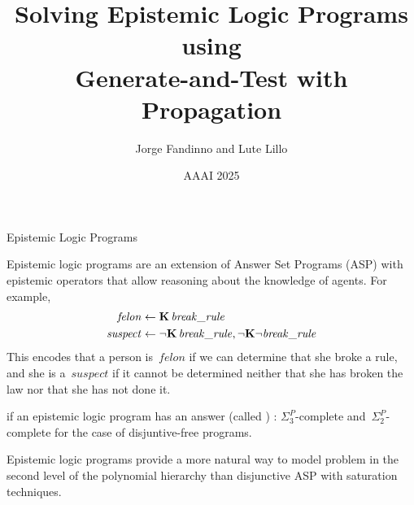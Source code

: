 \documentclass[aspectratio=169,svgnames,xcolor=table,t]{beamer}
\author[J. Fandinno \& Eleuterio Lillo Portero]{{\usebeamercolor[fg]{alerted text}Jorge Fandinno} and Lute Lillo}
\date{AAAI 2025}
\institute[UNO]{
    Department of Computer Science \\
    University of Nebraska Omaha
}
\title{Solving Epistemic Logic Programs using\\Generate-and-Test with Propagation}
\begin{document}
\frame{\titlepage}
\begin{frame}{Epistemic Logic Programs}
    \begin{myitemize}
        \item Epistemic logic programs are an extension of Answer Set Programs (ASP) with epistemic operators that allow reasoning about the knowledge of agents. For example,
        \begin{align*}
            \mathit{felon}   &\leftarrow \mathbf{K}\, \mathit{break\_rule}
            \\
            \mathit{suspect} &\leftarrow \neg \mathbf{K}\, \mathit{break\_rule}, \neg \mathbf{K} \neg \mathit{break\_rule}
        \end{align*}
        This encodes that a person is~$\mathit{felon}$ if we can determine that she broke a rule, and she is a~$\mathit{suspect}$ if it cannot be determined neither that she has broken the law nor that she has not done it.
    
        \bigskip

        \item {} if an epistemic logic program has an answer (called ) : $\Sigma^P_3$-complete and~$\Sigma^P_2$-complete for the case of disjuntive\nobreak-free programs.
        
        \bigskip

        \item Epistemic logic programs provide a more natural way to model problem in the second level of the polynomial hierarchy than disjunctive ASP with saturation techniques.
    \end{myitemize}
    \end{frame}
\end{document}

